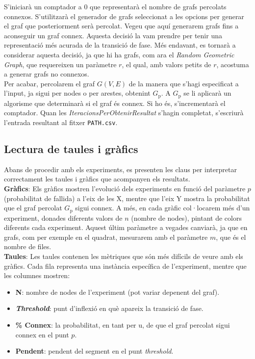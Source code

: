 \documentclass[a4paper]{article}
\begin{document}
	S'iniciarà un comptador a 0 que representarà el nombre de grafs percolats connexos. S'utilitzarà el generador de grafs seleccionat a les opcions per generar el graf que posteriorment serà percolat. Vegeu que aquí generarem grafs fins a aconseguir un graf connex. Aquesta decisió la vam prendre per tenir una representació més acurada de la transició de fase. Més endavant, es tornarà a considerar aquesta decisió, ja que hi ha grafs, com ara el \textit{Random Geometric Graph}, que requereixen un paràmetre $r$, el qual, amb valors petits de $r$, acostuma a generar grafs no connexos. \\
	
	Per acabar, percolarem el graf $G(V,E)$ de la manera que s'hagi especificat a l'input, ja sigui per nodes o per arestes, obtenint $G_{\text{p}}$. A $G_{\text{p}}$ se li aplicarà un algorisme que determinarà si el graf és connex. Si ho és, s'incrementarà el comptador. Quan les \textit{IteracionsPerObtenirResultat} s'hagin completat, s'escriurà l'entrada resultant al fitxer \texttt{PATH.csv}.
	
	\subsection{Lectura de taules i gràfics}
	
	Abans de procedir amb els experiments, es presenten les claus per interpretar correctament les taules i gràfics que acompanyen els resultats. \\
	
	\textbf{Gràfics}: Els gràfics mostren l'evolució dels experiments en funció del paràmetre $p$ (probabilitat de fallida) a l'eix de les X, mentre que l'eix Y mostra la probabilitat que el graf percolat $G_{\text{p}}$ sigui connex. A més, en cada gràfic col·locarem més d'un experiment, donades diferents valors de $n$ (nombre de nodes), pintant de colors diferents cada experiment. Aquest últim paràmetre a vegades canviarà, ja que en grafs, com per exemple en el quadrat, mesurarem amb el paràmetre $m$, que és el nombre de files. \\
	
	\textbf{Taules}: Les taules contenen les mètriques que són més difícils de veure amb els gràfics. Cada fila representa una instància específica de l'experiment, mentre que les columnes mostren:
	
	\begin{itemize}
		\item \textbf{N}: nombre de nodes de l'experiment (pot variar depenent del graf).
		\item \textbf{\textit{Threshold}}: punt d'inflexió en què apareix la transició de fase.
		\item \textbf{\% Connex}: la probabilitat, en tant per u, de que el graf percolat sigui connex en el punt $p$.
		\item \textbf{Pendent}: pendent del segment en el punt \textit{threshold}.
	\end{itemize}
	
\end{document}

